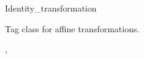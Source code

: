 \begin{ccRefClass}{Identity_transformation}

\ccDefinition
Tag class for affine transformations.

\ccSeeAlso
{}, 
\end{ccRefClass}
